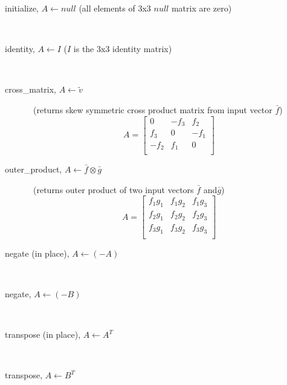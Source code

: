 \begin{description}
  \item[initialize, $A \leftarrow null$ (all elements of 3x3 $null$ matrix are zero)]\ \newline

  \item[identity, $A\leftarrow I$ ($I$ is the 3x3 identity matrix)]\ \newline

  \item[cross\_matrix, $A\leftarrow \tilde{v} $]\ (returns skew symmetric cross product matrix from input vector $\bar{f}$)\newline
    \begin{equation}\nonumber
    A = \left[
    \begin{array}{rrr}
     0   & -f_3 &  f_2 \\
     f_3 &  0   & -f_1 \\
    -f_2 &  f_1 &  0   \\
    \end{array}\right]
    \end{equation}

  \item[outer\_product, $A\leftarrow \bar{f}\otimes\bar{g}$]\ (returns outer product of two input vectors $\bar{f}$ and$\bar{g}$)\newline
    \begin{equation}\nonumber
    A = \left[
    \begin{array}{rrr}
     f_1g_1 & f_1g_2 & f_1g_3 \\
     f_2g_1 & f_2g_2 & f_2g_3 \\
     f_3g_1 & f_3g_2 & f_3g_3 \\
    \end{array}\right]
    \end{equation}

  \item[negate (in place), $A\leftarrow(-A)$]\ \newline

  \item[negate, $A\leftarrow (-B)$]\ \newline

  \item[transpose (in place), $A\leftarrow A^T$]\ \newline

  \item[transpose, $A\leftarrow B^T$]\ \newline


\end{description}
